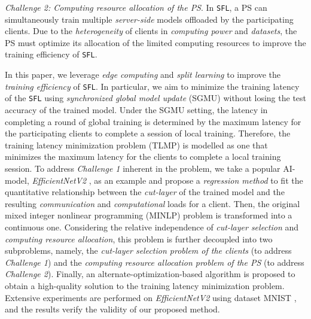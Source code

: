 \documentclass[10pt,journal,transmag]{IEEEtran}
\begin{document}
\textit{Challenge 2: Computing resource allocation of the PS}. In \texttt{SFL}, a PS can simultaneously train multiple \textit{server-side} models offloaded by the participating clients. Due to the \textit{heterogeneity} of clients in \textit{computing power} and \textit{datasets}, the PS must optimize its allocation of the limited computing resources to improve the training efficiency of \texttt{SFL}.

In this paper, we leverage \textit{edge computing} and \textit{split learning} to improve the \textit{training efficiency} of \texttt{SFL}. In particular, we aim to minimize the training latency of the \texttt{SFL} using \textit{synchronized global model update} (SGMU) \cite{9778210} without losing the test accuracy of the trained model. 
Under the SGMU setting, the latency in completing a round of global training is determined by the maximum latency for the participating clients to complete a session of local training. 
Therefore, the training latency minimization problem (TLMP) is modelled as one that minimizes the maximum latency for the clients to complete a local training session.
To address \textit{Challenge 1} inherent in the problem, we take a popular AI-model, \textit{EfficientNetV2} \cite{tan2021efficientnetv2}, as an example and propose a \textit{regression method} to fit the quantitative relationship between the \textit{cut-layer} of the trained model and the resulting \textit{communication} and \textit{computational} loads for a client. Then, the original mixed integer nonlinear programming (MINLP) problem is transformed into a continuous one. Considering the relative independence of \textit{cut-layer selection} and \textit{computing resource allocation}, this problem is further decoupled into two subproblems, namely, the \textit{cut-layer selection problem of the clients} (to address \textit{Challenge 1}) and the \textit{computing resource allocation problem of the PS} (to address \textit{Challenge 2}). Finally, an alternate-optimization-based algorithm is proposed to obtain a high-quality solution to the training latency minimization problem.
Extensive experiments are performed on \textit{EfficientNetV2} using dataset MNIST \cite{deng2012mnist}, and the results verify the validity of our proposed method.
\end{document}

